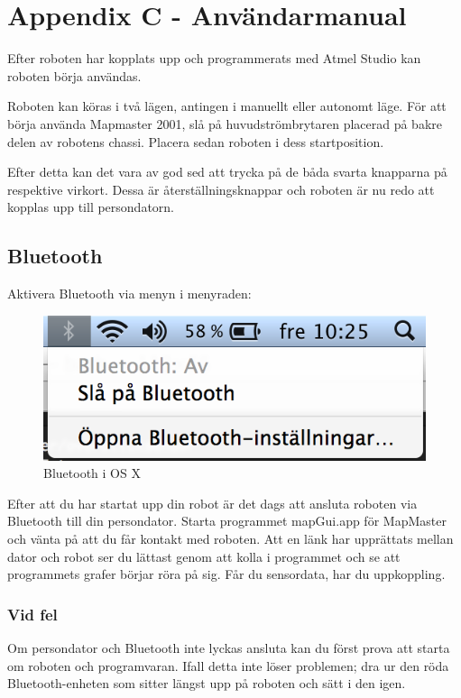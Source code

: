 \documentclass[a4paper,12pt,fleqn]{article}
\begin{document}
\section{Appendix C - Användarmanual}

Efter roboten har kopplats upp och programmerats med Atmel Studio kan roboten börja användas. 

Roboten kan köras i två lägen, antingen i manuellt eller autonomt läge. För att börja använda Mapmaster 2001, slå på huvudströmbrytaren placerad på bakre delen av robotens chassi. Placera sedan roboten i dess startposition. 

Efter detta kan det vara av god sed att trycka på de båda svarta knapparna på respektive virkort. Dessa är återställningsknappar och roboten är nu redo att kopplas upp till persondatorn. 

\subsection{Bluetooth}
Aktivera Bluetooth via menyn i menyraden: 

\begin{figure}[htp] %
  \begin{center}
  \includegraphics[keepaspectratio=true,width=0.5\linewidth]{bilder/bluetooth.png}  %
  \end{center}
  \caption{Bluetooth i OS X} %
  \label{fig:bluetooth}
\end{figure}

Efter att du har startat upp din robot är det dags att ansluta roboten via Bluetooth till din persondator. Starta programmet mapGui.app för MapMaster och vänta på att du får kontakt med roboten. Att en länk har upprättats mellan dator och robot ser du lättast genom att kolla i programmet och se att programmets grafer börjar röra på sig. Får du sensordata, har du uppkoppling. 

\subsubsection{Vid fel}
Om persondator och Bluetooth inte lyckas ansluta kan du först prova att starta om roboten och programvaran. Ifall detta inte löser problemen; dra ur den röda Bluetooth-enheten som sitter längst upp på roboten och sätt i den igen. 
\end{document}
